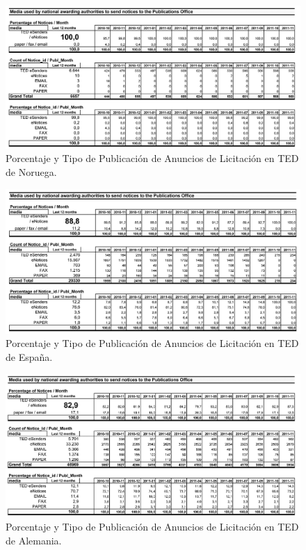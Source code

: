 \begin{description}
\begin{figure}[!htb]
\centering
	\includegraphics[width=16cm]{images/phd/eproc/circa-7}
\caption{Porcentaje y Tipo de Publicación de Anuncios de Licitación en TED de Noruega.}
\label{fig:circa-7}
\end{figure}


\begin{figure}[!htb]
\centering
	\includegraphics[width=16cm]{images/phd/eproc/circa-6}
\caption{Porcentaje y Tipo de Publicación de Anuncios de Licitación en TED de España.}
\label{fig:circa-6}
\end{figure}



 \begin{figure}[!htb]
\centering
	\includegraphics[width=16cm]{images/phd/eproc/circa-5}
\caption{Porcentaje y Tipo de Publicación de Anuncios de Licitación en TED de Alemania.}
\label{fig:circa-5}
\end{figure}




\end{description}
